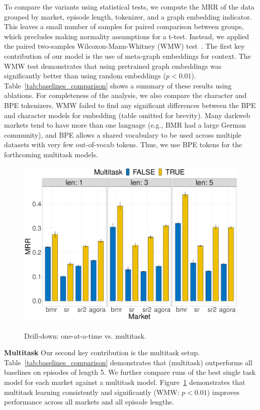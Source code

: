 To compare the variants using statistical tests, we compute the MRR of the data grouped by market, episode length, tokenizer, and a graph embedding indicator.
This leaves a small number of samples for paired comparison between groups, which precludes making normality assumptions for a t-test. 
Instead, we applied the paired two-samples Wilcoxon-Mann-Whitney (WMW) test~\cite{mann1947test}.
The first key contribution of our model is the use of meta-graph embeddings for context. 
The WMW test demonstrates that using pretrained graph embeddings was significantly better than using random embeddings ($p < 0.01$). 
Table~\ref{tab:baselines_comparison} shows a summary of these results using ablations.
For completeness of the analysis, we also compare the character and BPE tokenizers.
WMW failed to find any significant differences between the BPE and character models for embedding (table omitted for brevity). 
Many darkweb markets tend to have more than one language (e.g., BMR had a large German community), and BPE  allows a shared vocabulary to be used across multiple datasets with very few out-of-vocab tokens. 
Thus, we use BPE tokens for the forthcoming multitask models.
\begin{figure}[!htbp]
    \centering
    \includegraphics[width=0.8\linewidth,alt={Bar chart showing drill-down: one-at-a-time vs. multitask.}]{sysml/plots/multitask.pdf}
    \caption{Drill-down: one-at-a-time vs. multitask.}
    \label{fig:multitask_results}
\end{figure} 

\noindent \textbf{Multitask} Our second key contribution is the multitask setup.
Table~\ref{tab:baselines_comparison} demonstrates that \SYSMLmethodname{} (multitask) outperforms all baselines on episodes of length 5. We further compare runs of the best single task model for each market against a multitask model. %
Figure~\ref{fig:multitask_results} demonstrates that multitask learning  consistently and significantly (WMW: $p < 0.01$) improves performance across all markets and all episode lengths. 




